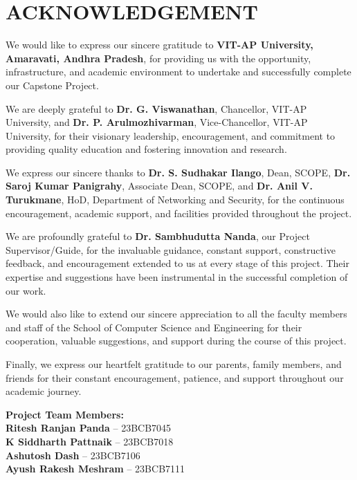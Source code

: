 \chapter*{ACKNOWLEDGEMENT}

\enlargethispage{2\baselineskip}

We would like to express our sincere gratitude to \textbf{VIT-AP University, Amaravati, Andhra Pradesh}, for providing us with the opportunity, infrastructure, and academic environment to undertake and successfully complete our Capstone Project.

We are deeply grateful to \textbf{Dr. G. Viswanathan}, Chancellor, VIT-AP University, and \textbf{Dr. P. Arulmozhivarman}, Vice-Chancellor, VIT-AP University, for their visionary leadership, encouragement, and commitment to providing quality education and fostering innovation and research.

We express our sincere thanks to \textbf{Dr. S. Sudhakar Ilango}, Dean, SCOPE, \textbf{Dr. Saroj Kumar Panigrahy}, Associate Dean, SCOPE, and \textbf{Dr. Anil V. Turukmane}, HoD, Department of Networking and Security, for the continuous encouragement, academic support, and facilities provided throughout the project.

We are profoundly grateful to \textbf{Dr. Sambhudutta Nanda}, our Project Supervisor/Guide, for the invaluable guidance, constant support, constructive feedback, and encouragement extended to us at every stage of this project. Their expertise and suggestions have been instrumental in the successful completion of our work.

We would also like to extend our sincere appreciation to all the faculty members and staff of the School of Computer Science and Engineering for their cooperation, valuable suggestions, and support during the course of this project.

Finally, we express our heartfelt gratitude to our parents, family members, and friends for their constant encouragement, patience, and support throughout our academic journey.

\vspace{0.6cm}

\noindent
\textbf{Project Team Members:}\\
\textbf{Ritesh Ranjan Panda} -- 23BCB7045\\
\textbf{K Siddharth Pattnaik} -- 23BCB7018\\
\textbf{Ashutosh Dash} -- 23BCB7106\\
\textbf{Ayush Rakesh Meshram} -- 23BCB7111
